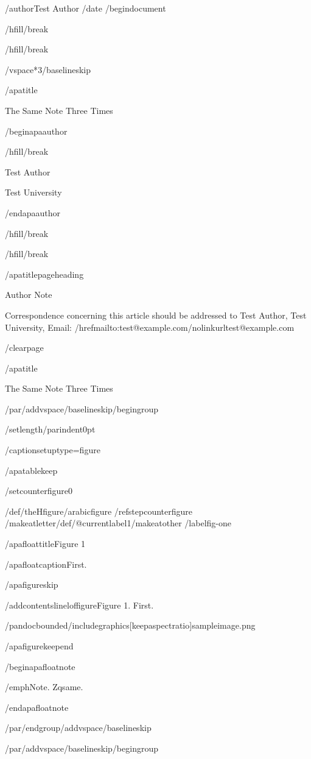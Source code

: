 /author{Test Author}
/date{}
/begin{document}


/hfill/break

/hfill/break

/vspace*{3/baselineskip}

/apatitle{

The Same Note Three Times

}

/begin{apaauthor}

/hfill/break

Test Author

Test University

/end{apaauthor}

/hfill/break

/hfill/break

/apatitlepageheading{

Author Note

}

Correspondence concerning this article should be addressed to Test
Author, Test University, Email:
/href{mailto:test@example.com}{/nolinkurl{test@example.com}}

/clearpage

/apatitle{

The Same Note Three Times

}

/par/addvspace{/baselineskip}/begingroup

/setlength{/parindent}{0pt}

/captionsetup{type=figure}

/apatablekeep

/setcounter{figure}{0}

/def/theHfigure{/arabic{figure}}%
/refstepcounter{figure}%
/makeatletter/def/@currentlabel{1}/makeatother%
/label{fig-one}

/apafloattitle{Figure 1}

/apafloatcaption{First.}

/apafigureskip

/addcontentsline{lof}{figure}{Figure 1. First.}

/pandocbounded{/includegraphics[keepaspectratio]{sampleimage.png}}

/apafigurekeepend

/begin{apafloatnote}

/emph{Note}. Zqsame.

/end{apafloatnote}

/par/endgroup/addvspace{/baselineskip}

/par/addvspace{/baselineskip}/begingroup

